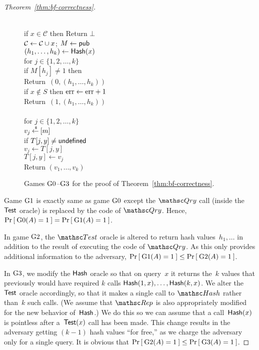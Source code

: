 \begin{proof}[Theorem~\ref{thm:bf-correctness}]
\begin{figure}[tp]
{{\\
if $x \in \mathcal{C}$ then Return $\bot$\\
${\cal C} \gets {\cal C} \cup x$; $M \gets{\sf pub}$\\
$(h_1, \ldots, h_{k}) \gets \mathsf{Hash}(x)$\\
for $j \in \{1,2,\ldots,k\}$\\
\nudge if $M[h_j] \neq 1$ then \\
\nudge \nudge Return~$(0, (h_1, \ldots, h_{k}) )$\\
if $x \not \in S$ then $\mathrm{err} \gets \mathrm{err} +1$\\
Return~$(1, (h_1, \ldots, h_{k}) )$\\

\\
for $j \in \{1,2,\ldots,k\}$\\
\nudge $v_j {\:\stackrel{{\scriptscriptstyle \hspace{0.2em}\$}} {\leftarrow}\:} [m]$\\
\nudge if $T[j,y] \neq \mathsf{undefined}$\\
\nudge \nudge $v_j \gets T[j,y]$\\
\nudge $T[j,y] \gets v_j$\\
Return $\left(v_1,\ldots,v_k\right)$ } } \caption{Games
$\text{G0}$--$\text{G3}$ for the proof of
Theorem~\ref{thm:bf-correctness}.} \label{fig:bf-correctness-games1}
\end{figure}


Game $\text{G1}$ is exactly same as game $\text{G0}$ except the $\Qry$
call (inside the $\mathsf{Test}$ oracle) is replaced by the code of
$\Qry$.  Hence, $\Pr\left[\: \text{G0}(A) = 1 \:\right] = \Pr\left[\: \text{G1}(A) = 1 \:\right]$.

In game $\text{G2}$, the $\Test$ oracle is altered to return hash
values~$h_1,\ldots$ in addition to the result of executing the code
of $\Qry$.  As this only provides additional information to the
adversary, $\Pr\left[\: \text{G1}(A) = 1 \:\right] \leq \Pr\left[\: \text{G2}(A) = 1 \:\right]$.


In $\text{G3}$, we modify the $\mathsf{Hash}$ oracle so that on
query~$x$ it returns the~$k$ values that previously would have
required $k$ calls $\mathsf{Hash}(1,x), \ldots, \mathsf{Hash}(k,x)$. We
alter the $\mathsf{Test}$ oracle accordingly, so that it makes a
single call to $\Hash$ rather than~$k$ such calls. (We assume that
$\Rep$ is also appropriately modified for the new behavior
of~$\mathsf{Hash}$.) We do this so we can assume that a
call~$\mathsf{Hash}(x)$ is pointless after a~$\mathsf{Test}(x)$ call has
been made. This change results in the adversary getting $(k-1)$ hash
values ``for free,'' as we charge the adversary only for a single
query.   It is obvious that
$\Pr\left[\: \text{G2}(A) = 1 \:\right] \leq \Pr\left[\: \text{G3}(A) = 1 \:\right]$.


\end{proof}
